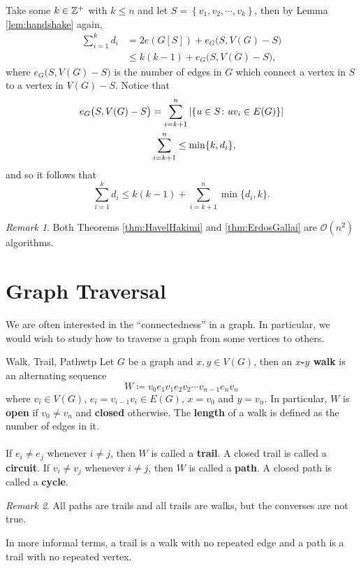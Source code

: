 \documentclass[math]{amznotes}
\theoremstyle{remark}
\newtheorem*{remark}{Remark}
\begin{document}
Take some $k \in \mathbb{Z}^+$ with $k \leq n$ and let $S = \left\{v_1, v_2, \cdots, v_k\right\}$, then by Lemma \ref{lem:handshake} again,
\begin{align*}
    \sum_{i = 1}^{k}d_i & = 2e(G[S]) + e_G\bigl(S, V(G) - S\bigr) \\
    & \leq k(k - 1) + e_G\bigl(S, V(G) - S\bigr),
\end{align*}
where $e_G\bigl(S, V(G) - S\bigr)$ is the number of edges in $G$ which connect a vertex in $S$ to a vertex in $V(G) - S$. Notice that
\begin{align*}
    e_G\bigl(S, V(G) - S\bigr) & = \sum_{i = k + 1}^n{\left\lvert {\left\{u \in S \colon uv_i \in E(G)\right\}} \right\rvert} \\
    & \sum_{i = k + 1}^n\leq \min\{k, d_i\},
\end{align*}
and so it follows that
\begin{equation*}
    \sum_{i = 1}^{k} d_i \leq k(k - 1) + \sum_{i = k + 1}^{n}\min\{d_i, k\}.
\end{equation*}
\begin{notebox}
    \begin{remark}
        Both Theorems \ref{thm:HavelHakimi} and \ref{thm:ErdosGallai} are $\mathcal{O}(n^2)$ algorithms.
    \end{remark}
\end{notebox}


\section{Graph Traversal}
We are often interested in the ``connectedness'' in a graph. In particular, we would wish to study how to traverse a graph from some vertices to others.
\begin{dfnbox}{Walk, Trail, Path}{wtp}
    Let $G$ be a graph and $x, y \in V(G)$, then an {\color{red} \textbf{$x$-$y$ walk}} is an alternating sequence
    \begin{equation*}
        W \coloneqq v_0e_1v_1e_2v_2\cdots v_{n - 1}e_nv_n
    \end{equation*}
    where $v_i \in V(G)$, $e_i = v_{i - 1}v_i \in E(G)$, $x = v_0$ and $y = v_n$. In particular, $W$ is {\color{red} \textbf{open}} if $v_0 \neq v_n$ and {\color{red} \textbf{closed}} otherwise. The {\color{red} \textbf{length}} of a walk is defined as the number of edges in it.
    \\\\
    If $e_i \neq e_j$ whenever $i \neq j$, then $W$ is called a {\color{red} \textbf{trail}}. A closed trail is called a {\color{red} \textbf{circuit}}. If $v_i \neq v_j$ whenever $i \neq j$, then $W$ is called a {\color{red} \textbf{path}}. A closed path is called a {\color{red} \textbf{cycle}}.
\end{dfnbox}
\begin{notebox}
    \begin{remark}
        All paths are trails and all trails are walks, but the converses are not true.
    \end{remark}
\end{notebox}
In more informal terms, a trail is a walk with no repeated edge and a path is a trail with no repeated vertex.
\end{document}
